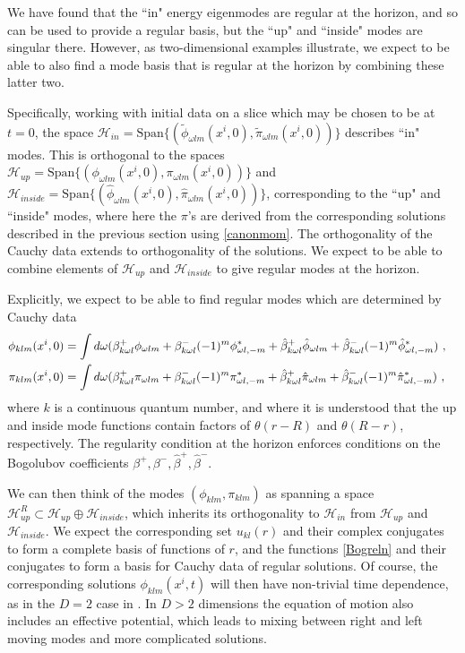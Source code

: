 \documentclass[11pt]{article}
\numberwithin{equation}{section}
\newcommand{\bea}{\begin{eqnarray}}
\newcommand{\eea}{\end{eqnarray}}
\begin{document}
We have found that the ``in" energy eigenmodes are regular at the horizon, and so can be used to provide a regular basis, but the ``up" and ``inside" modes are singular there.  However, as two-dimensional examples illustrate\cite{SEHS,SE2d}, we expect to be able to  also find a mode basis that is regular at the horizon by combining these latter two.

Specifically, working with initial data on a slice which may be chosen to be at $t=0$, the space $\mathcal{H}_{in}= \text{Span}\{(\tilde{\phi}_{\omega lm}(x^i,0),\tilde{\pi}_{\omega lm}(x^i,0))\}$ describes ``in" modes.  This is orthogonal to the spaces 
$\mathcal{H}_{up}= \text{Span}\{({\phi}_{\omega lm}(x^i,0),{\pi}_{\omega lm}(x^i,0))\}$
and $\mathcal{H}_{inside}= \text{Span}\{(\hat{\phi}_{\omega lm}(x^i,0),\hat{\pi}_{\omega lm}(x^i,0))\}$, corresponding to the ``up" and ``inside" modes, where here the $\pi$'s are derived from the corresponding solutions described in the previous section using \eqref{canonmom}.  The orthogonality of the Cauchy data extends to orthogonality of the solutions.  We  expect to be able to combine elements of $\mathcal{H}_{up}$ and $\mathcal{H}_{inside}$ to give regular modes at the horizon.  

Explicitly, we  expect to be able to find regular modes which are determined by Cauchy data
\bea\label{Bogreln}
 \phi_{klm }(x^i,0)&= \int d\omega (\beta^+_{k\omega l} \phi_{\omega lm}+\beta^-_{k\omega l} (-1)^m\phi^*_{\omega l,-m}+
   \hat{\beta}^+_{k\omega l} \hat{\phi}_{\omega lm}+
   \hat{\beta}^-_{k\omega l} (-1)^m \hat{\phi}^*_{\omega l,-m})\ ,\cr
 \pi_{klm }(x^i,0)&= \int d\omega (\beta^+_{k\omega l} \pi_{\omega lm}+\beta^-_{k\omega l} (-1)^m\pi^*_{\omega l,-m}+
   \hat{\beta}^+_{k\omega l}  \hat{\pi}_{\omega lm}+
   \hat{\beta}^-_{k\omega l} (-1)^m \hat{\pi}^*_{\omega l,-m})\ ,
\eea
where $k$ is a continuous quantum number, and where it is understood that the up and inside mode functions contain factors of $\theta(r-R)$ and $\theta(R-r)$, respectively.  The regularity condition at the horizon enforces conditions on the Bogolubov coefficients $\beta^+, \beta^-,\hat \beta^+,\hat \beta^-$.  

We can then think of the modes $(\phi_{klm},\pi_{klm})$ as spanning a space  $\mathcal{H}^R_{up}\subset {\mathcal{H}}_{up} \oplus \mathcal{H}_{inside}$, which inherits its orthogonality to $\mathcal{H}_{in}$ from ${\mathcal{H}}_{up}$ and $ \mathcal{H}_{inside}$.  We expect the corresponding set $u_{kl}(r)$ and their complex conjugates to form a complete basis of functions of $r$, and
the functions \eqref{Bogreln} and their conjugates to form a basis for Cauchy data of regular solutions.
Of course, the corresponding solutions $\phi_{klm}(x^i,t)$ will then have non-trivial time dependence, as in the $D=2$ case in \cite{SEHS}. In $D>2$ dimensions the equation of motion also  includes an effective potential, which leads to mixing between right and left moving modes and more complicated solutions.
\end{document}
